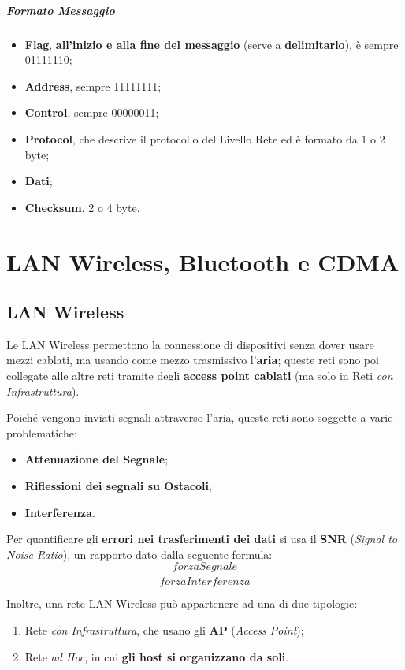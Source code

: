 \documentclass[a4paper]{article}
\begin{document}
 				\subparagraph{Formato Messaggio}
 					\begin{itemize}
 						\item \textbf{Flag}, \textbf{all'inizio e alla fine del messaggio} (serve a \textbf{delimitarlo}), è sempre 01111110;
 						\item \textbf{Address}, sempre 11111111;
 						\item \textbf{Control}, sempre 00000011;
 						\item \textbf{Protocol}, che descrive il protocollo del Livello Rete ed è formato da 1 o 2 byte;
 						\item \textbf{Dati};
 						\item \textbf{Checksum}, 2 o 4 byte.
 					\end{itemize}
 					
\newpage 					
 
 
\section{LAN Wireless, Bluetooth e CDMA}


	\subsection{LAN Wireless}
	
		Le LAN Wireless permettono la connessione di dispositivi senza dover usare mezzi cablati, ma usando come mezzo trasmissivo l'\textbf{aria}; queste reti sono poi collegate alle altre reti tramite degli \textbf{access point cablati} (ma solo in Reti \emph{con Infrastruttura}).
		
		Poiché vengono inviati segnali attraverso l'aria, queste reti sono soggette a varie problematiche:
		\begin{itemize}
			\item \textbf{Attenuazione del Segnale};
			\item \textbf{Riflessioni dei segnali su Ostacoli};
			\item \textbf{Interferenza}.
		\end{itemize}
		
		Per quantificare gli \textbf{errori nei trasferimenti dei dati} si usa il \textbf{SNR} (\emph{Signal to Noise Ratio}), un rapporto dato dalla seguente formula:
		\[ \frac{forzaSegnale}{forzaInterferenza} \]
		
		Inoltre, una rete LAN Wireless può appartenere ad una di due tipologie:
		\begin{enumerate}
			\item Rete \emph{con Infrastruttura}, che usano gli \textbf{AP} (\emph{Access Point});
			\item Rete \emph{ad Hoc}, in cui \textbf{gli host si organizzano da soli}.
		\end{enumerate}
		
\end{document}
